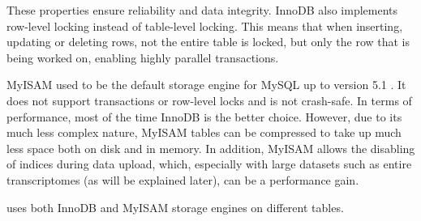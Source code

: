 These properties ensure reliability and data integrity. InnoDB also implements
row-level locking instead of table-level locking. This means that when
inserting, updating or deleting rows, not the entire table is locked, but only
the row that is being worked on, enabling highly parallel transactions. 

MyISAM used to be the default storage engine for MySQL up to version 5.1
\citep{schwartz2012}. It does not support transactions or row-level locks and is
not crash-safe. In terms of performance, most of the time InnoDB is the better
choice. However, due to its much less complex nature, MyISAM tables can be
compressed to take up much less space both on disk and in memory. In addition,
MyISAM allows the disabling of indices during data upload, which, especially
with large datasets such as entire transcriptomes (as will be explained later),
can be a performance gain. 

\pname uses both InnoDB and MyISAM storage engines on different tables.
